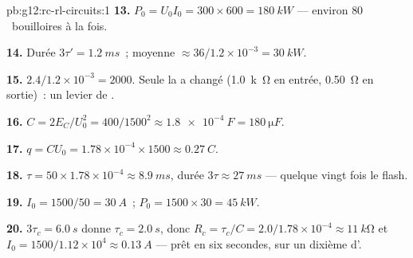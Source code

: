 \begin{solution}{pb:g12:rc-rl-circuits:1}
\textbf{13.} $P_0 = U_0 I_0 = 300 \times 600 = \qty{180}{kW}$ ---
environ $80$~bouilloires à la fois.

\textbf{14.} Durée $3\tau' = \qty{1.2}{ms}$~; 
moyenne $\approx 36/1.2\times10^{-3} = \qty{30}{kW}$.

\textbf{15.} $2.4/1.2\times10^{-3} = 2000$. Seule la
 a changé (\qty{1.0}{k\ohm} en entrée,
\qty{0.50}{\ohm} en sortie)~: un levier de
.

\textbf{16.} $C = 2E_C/U_0^2 = 400/1500^2 \approx \qty{1.8e-4}{F} =
\qty{180}{\micro F}$.

\textbf{17.} $q = CU_0 = 1.78\times10^{-4} \times 1500 \approx
\qty{0.27}{C}$.

\textbf{18.} $\tau = 50 \times 1.78\times10^{-4} \approx \qty{8.9}{ms}$,
durée $3\tau \approx \qty{27}{ms}$ --- quelque vingt fois le flash.

\textbf{19.} $I_0 = 1500/50 = \qty{30}{A}$~;
$P_0 = 1500 \times 30 = \qty{45}{kW}$.

\textbf{20.} $3\tau_c = \qty{6.0}{s}$ donne $\tau_c = \qty{2.0}{s}$,
donc $R_c = \tau_c/C = 2.0/1.78\times10^{-4} \approx \qty{11}{k\ohm}$
et $I_0 = 1500/1.12\times10^{4} \approx \qty{0.13}{A}$ --- prêt en six
secondes, sur un dixième d'.
\end{solution}
